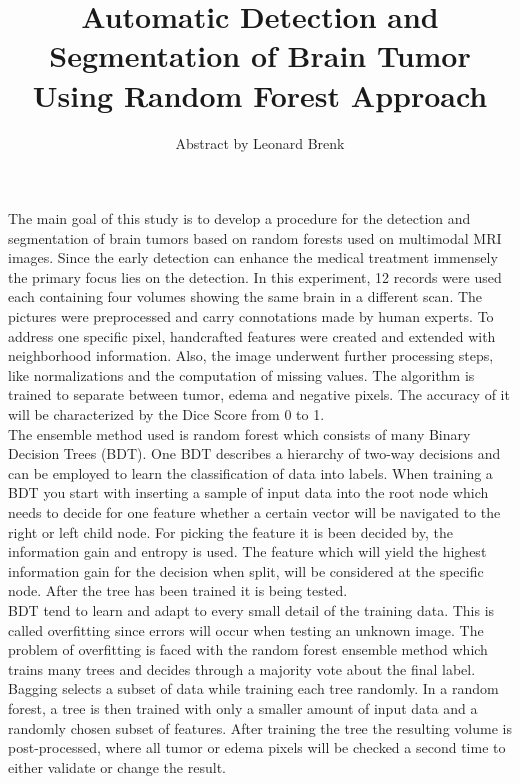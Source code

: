\documentclass{article}
\title{Automatic Detection and Segmentation of Brain Tumor Using Random Forest Approach}
\author{Abstract by Leonard Brenk}
\begin{document}
 \maketitle
 \newpage
 The main goal of this study is to develop a procedure for the detection and segmentation of brain tumors based on random forests used on multimodal MRI images. Since the early detection can enhance the medical treatment immensely the primary focus lies on the detection. In this experiment, 12 records were used each containing four volumes showing the same brain in a different scan. The pictures were preprocessed and carry connotations made by human experts. To address one specific pixel, handcrafted features were created and extended with neighborhood information. Also, the image underwent further processing steps, like normalizations and the computation of missing values. The algorithm is trained to separate between tumor, edema and negative pixels. The accuracy of it will be characterized by the Dice Score from 0 to 1. \\

 The ensemble method used is random forest which consists of many Binary Decision Trees (BDT). One BDT describes a hierarchy of two-way decisions and can be employed to learn the classification of data into labels. When training a BDT you start with inserting a sample of input data into the root node which needs to decide for one feature whether a certain vector will be navigated to the right or left child node. For picking the feature it is been decided by, the information gain and entropy is used. The feature which will yield the highest information gain for the decision when split, will be considered at the specific node. After the tree has been trained it is being tested. \\
 
 BDT tend to learn and adapt to every small detail of the training data. This is called overfitting since errors will occur when testing an unknown image. The problem of overfitting is faced with the random forest ensemble method which trains many trees and decides through a majority vote about the final label. Bagging selects a subset of data while training each tree randomly. In a random forest, a tree is then trained with only a smaller amount of input data and a randomly chosen subset of features. After training the tree the resulting volume is post-processed, where all tumor or edema pixels will be checked a second time to either validate or change the result. \\
 
\end{document}
